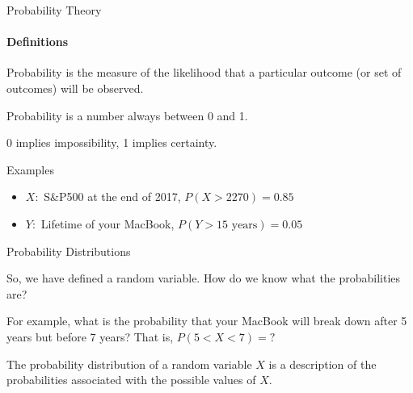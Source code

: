 \documentclass{beamer}\usepackage[]{graphicx}\usepackage[]{color}
\begin{document}
\begin{darkframes}
	
	
	\begin{frame}[label=lists]{Probability Theory}
		\framesubtitle{Definitions}    
		
      	\begin{definition}
       		\alert{Probability} is the measure of the likelihood that a particular outcome (or set of outcomes) will be observed. \newline
       		
       		Probability is a number always between 0 and 1. \newline
       		
       		0 implies impossibility, 1 implies certainty.
      	\end{definition}
    
    
    	\begin{exampleblock}{Examples}
      		\begin{itemize}

				\item $X:$ S\&P500 at the end of 2017, $P(X>2270) = 0.85$ %
				\item $Y:$ Lifetime of your MacBook, $ P(Y>15\text{ years})  = 0.05$

			\end{itemize}
        \end{exampleblock}
  
	\end{frame}  	
	
	
  
  
  
  
  
	\begin{frame}[label=lists]{Probability Distributions}
	
		So, we have defined a random variable. How do we know what the probabilities are? \newline
		
		For example, what is the probability that your MacBook will break down after 5 years but before 7 years? That is, $P(5<X<7)=?$\newline
  
		
      	\begin{definition}
       		The \alert{probability distribution} of a random variable $X$ is a description of the probabilities associated with the possible values of $X$. 
			\newline       		
       		

\end{definition}
\end{frame}
\end{darkframes}
\end{document}
